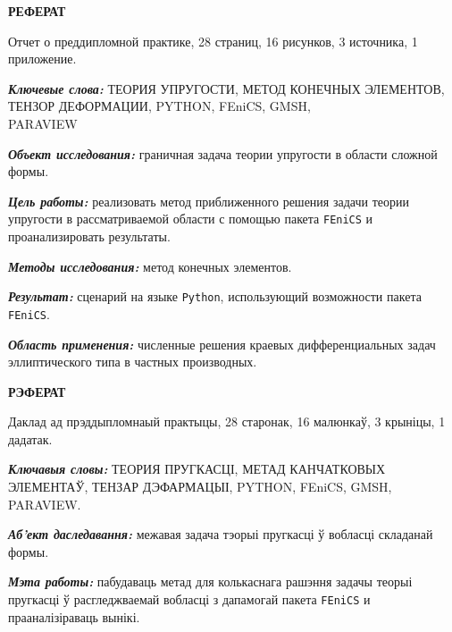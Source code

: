 \documentclass[a4paper, 14pt]{extreport}
\begin{document}
\renewcommand{\figurename}{Рисунок} %
\renewcommand{\contentsname}{\hfill\Large ОГЛАВЛЕНИЕ \hfill}
\renewcommand{\cftaftertoctitle}{\hfill}


\tableofcontents



\newpage
{}
\begin{center}
	\Large{\textbf{РЕФЕРАТ}}
\end{center}

Отчет о преддипломной практике, 28 страниц, 16 рисунков, 3 источника, 1 приложение.

\textbf{\textit{Ключевые слова:}} ТЕОРИЯ УПРУГОСТИ, МЕТОД КОНЕЧНЫХ 
ЭЛЕМЕНТОВ, ТЕНЗОР ДЕФОРМАЦИИ, PYTHON, FEniCS, 
GMSH, \\ PARAVIEW

\textbf{\textit{Объект исследования:}} граничная задача теории 
упругости в области сложной формы.

\textbf{\textit{Цель работы:}} реализовать метод приближенного решения
задачи теории упругости в рассматриваемой области с помощью пакета
\texttt{FEniCS} и проанализировать результаты.

\textbf{\textit{Методы исследования:}} метод конечных элементов.

\textbf{\textit{Результат:}} сценарий на языке \texttt{Python},
использующий возможности пакета \texttt{FEniCS}.

\textbf{\textit{Область применения:}} численные решения краевых 
дифференциальных задач эллиптического типа в частных производных.

\begin{center}
	\Large{\textbf{РЭФЕРАТ}}
\end{center}

Даклад ад прэддыпломнаый практыцы, 28 старонак, 16 малюнкаў, 3 крыніцы, 1 дадатак.

\textbf{\textit{Ключавыя словы:}} ТЕОРИЯ ПРУГКАСЦІ, МЕТАД КАНЧАТКОВЫХ \\
ЭЛЕМЕНТАЎ, ТЕНЗАР ДЭФАРМАЦЫІ, PYTHON, FEniCS, 
GMSH, \\
PARAVIEW.

\textbf{\textit{Аб'ект даследавання:}} межавая задача тэорыі 
пругкасці ў вобласці складанай формы.

\textbf{\textit{Мэта работы:}} пабудаваць метад для колькаснага 
рашэння задачы теорыі пругкасці ў расгледжваемай вобласці з
дапамогай пакета \texttt{FEniCS} и прааналізіраваць вынікі.
\end{document}
